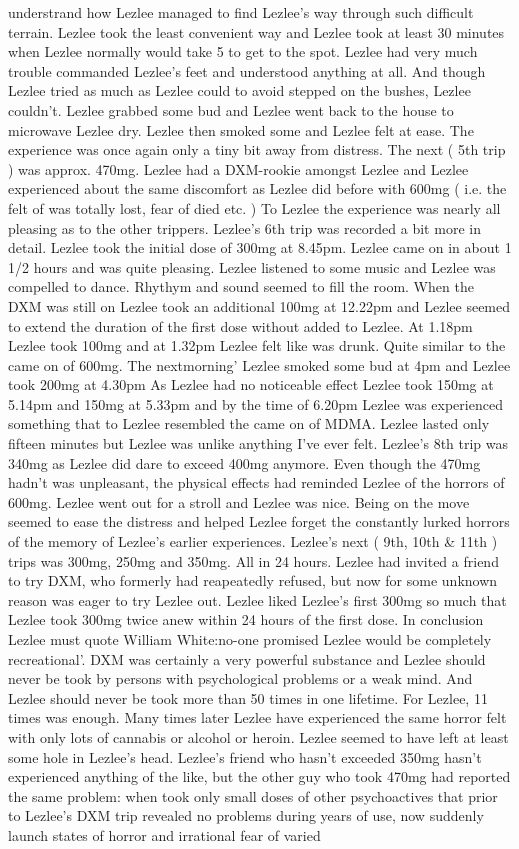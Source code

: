 \documentclass[12pt]{book}
\begin{document}
understrand how Lezlee managed to find Lezlee's way through such difficult terrain. Lezlee took the least convenient way and Lezlee took at least 30 minutes when Lezlee normally would take 5 to get to the spot. Lezlee had very much trouble commanded Lezlee's feet and understood anything at all. And though Lezlee tried as much as Lezlee could to avoid stepped on the bushes, Lezlee couldn't. Lezlee grabbed some bud and Lezlee went back to the house to microwave Lezlee dry. Lezlee then smoked some and Lezlee felt at ease. The experience was once again only a tiny bit away from distress. The next ( 5th trip ) was approx. 470mg. Lezlee had a DXM-rookie amongst Lezlee and Lezlee experienced about the same discomfort as Lezlee did before with 600mg ( i.e. the felt of was totally lost, fear of died etc. ) To Lezlee the experience was nearly all pleasing as to the other trippers. Lezlee's 6th trip was recorded a bit more in detail. Lezlee took the initial dose of 300mg at 8.45pm. Lezlee came on in about 1 1/2 hours and was quite pleasing. Lezlee listened to some music and Lezlee was compelled to dance. Rhythym and sound seemed to fill the room. When the DXM was still on Lezlee took an additional 100mg at 12.22pm and Lezlee seemed to extend the duration of the first dose without added to Lezlee. At 1.18pm Lezlee took 100mg and at 1.32pm Lezlee felt like was drunk. Quite similar to the came on of 600mg. The nextmorning' Lezlee smoked some bud at 4pm and Lezlee took 200mg at 4.30pm As Lezlee had no noticeable effect Lezlee took 150mg at 5.14pm and 150mg at 5.33pm and by the time of 6.20pm Lezlee was experienced something that to Lezlee resembled the came on of MDMA. Lezlee lasted only fifteen minutes but Lezlee was unlike anything I've ever felt. Lezlee's 8th trip was 340mg as Lezlee did dare to exceed 400mg anymore. Even though the 470mg hadn't was unpleasant, the physical effects had reminded Lezlee of the horrors of 600mg. Lezlee went out for a stroll and Lezlee was nice. Being on the move seemed to ease the distress and helped Lezlee forget the constantly lurked horrors of the memory of Lezlee's earlier experiences. Lezlee's next ( 9th, 10th \& 11th ) trips was 300mg, 250mg and 350mg. All in 24 hours. Lezlee had invited a friend to try DXM, who formerly had reapeatedly refused, but now for some unknown reason was eager to try Lezlee out. Lezlee liked Lezlee's first 300mg so much that Lezlee took 300mg twice anew within 24 hours of the first dose. In conclusion Lezlee must quote William White:no-one promised Lezlee would be completely recreational'. DXM was certainly a very powerful substance and Lezlee should never be took by persons with psychological problems or a weak mind. And Lezlee should never be took more than 50 times in one lifetime. For Lezlee, 11 times was enough. Many times later Lezlee have experienced the same horror felt with only lots of cannabis or alcohol or heroin. Lezlee seemed to have left at least some hole in Lezlee's head. Lezlee's friend who hasn't exceeded 350mg hasn't experienced anything of the like, but the other guy who took 470mg had reported the same problem: when took only small doses of other psychoactives that prior to Lezlee's DXM trip revealed no problems during years of use, now suddenly launch states of horror and irrational fear of varied 
\end{document}
